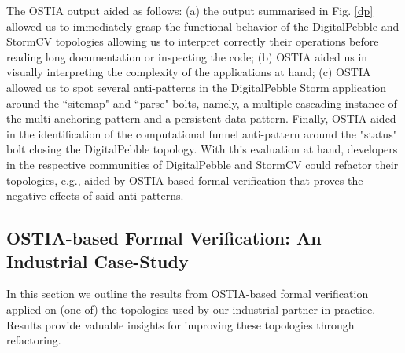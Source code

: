 The OSTIA output aided as follows: (a) the output summarised in Fig. \ref{dp}
allowed us to immediately grasp the functional behavior of the DigitalPebble and
StormCV topologies allowing us to interpret correctly their operations before
reading long documentation or inspecting the code; (b) OSTIA aided us in visually interpreting the complexity of the applications at hand; (c) OSTIA allowed us to spot several anti-patterns in the DigitalPebble Storm application around the ``sitemap" and ``parse" bolts, namely, a multiple cascading instance of the multi-anchoring pattern and a persistent-data pattern. Finally, OSTIA aided in the identification of the computational funnel anti-pattern around the "status" bolt closing the DigitalPebble topology. With this evaluation at hand, developers in the respective communities of DigitalPebble and StormCV could refactor their topologies, e.g., aided by OSTIA-based formal verification that proves the negative effects of said anti-patterns.
%
%

\subsection{OSTIA-based Formal Verification: An Industrial Case-Study}

In this section we outline the results from OSTIA-based formal verification applied on (one of) the topologies used by our industrial partner in practice. 
Results provide valuable insights for improving these topologies through refactoring.

